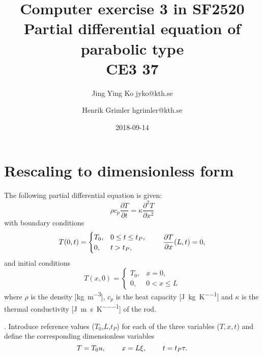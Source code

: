 \documentclass{article}
\date{2018-09-14}
\author{Jing Ying Ko jyko@kth.se 
\and Henrik Grimler hgrimler@kth.se}
\title{Computer exercise 3 in SF2520 \\Partial differential equation of parabolic type \\CE3 37 }
\begin{document}
\maketitle
\section{Rescaling to dimensionless form}

The following partial differential equation is given:
\begin{equation} \label{eq1}
\rho c_p \frac{\partial T}{\partial t} = \kappa \frac{\partial^2 T}{\partial x^2}
\end{equation}
with boundary conditions
\begin{equation} \label{eq2}
   T(0,t)= 
\begin{cases}
    T_0,           & 0 \leq t \leq t_P, \\
    0,              & t > t_P,
\end{cases}
   \hspace{0.8cm}         \frac{\partial T}{\partial x}(L,t)=0,
\end{equation}
and initial conditions
\begin{equation} \label{eq3}
   T(x,0)= 
\begin{cases}
    T_0,           & x=0, \\
    0,              & 0 < x \leq L
\end{cases}
\end{equation}
where $\rho$ is the density [\si{\kilo\gram\per\meter\cubed}], $c_p$ is the
heat capacity [\si{\joule\per\kilo\gram\per\kelvin}] and
$\kappa$ is the thermal conductivity [\si{\joule\per\meter\per\second\per\kelvin}] of the rod.
\newline

. Introduce reference values ($T_0$,$L$,$t_P$) for each of the three variables ($T,x,t$) and define the corresponding dimensionless variables
\begin{equation}
    T = T_0 u, \hspace{0.8cm} x = L \xi, \hspace{0.8cm} t = t_P \tau.
\end{equation}
\end{document}
